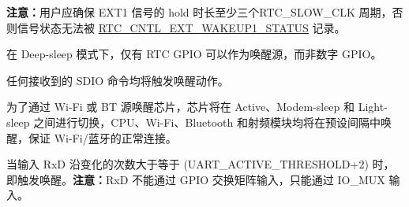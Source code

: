 \begin{table}[H]
\begin{threeparttable}
\begin{tablenotes}
        \textbf{注意：}用户应确保 EXT1 信号的 hold 时长至少三个RTC\_SLOW\_CLK 周期，否则信号状态无法被 \hyperref[regdesc:RTCCNTLEXTWAKEUP1STATUSREG]{RTC\_CNTL\_EXT\_WAKEUP1\_STATUS} 记录。
        \item[4] 在 Deep-sleep 模式下，仅有 RTC GPIO 可以作为唤醒源，而非数字 GPIO。
        \item[5] 任何接收到的 SDIO 命令均将触发唤醒动作。
        \item[6] 为了通过 Wi-Fi 或 BT 源唤醒芯片，芯片将在 Active、Modem-sleep 和 Light-sleep 之间进行切换，CPU、Wi-Fi、Bluetooth 和射频模块均将在预设间隔中唤醒，保证 Wi-Fi/蓝牙的正常连接。
        \item[7] 当输入 RxD 沿变化的次数大于等于 (UART\_ACTIVE\_THRESHOLD+2) 时，即触发唤醒。{\bfseries 注意：}RxD 不能通过 GPIO 交换矩阵输入，只能通过 IO\_MUX 输入。
    \end{tablenotes}
    \end{threeparttable}
\end{table}
